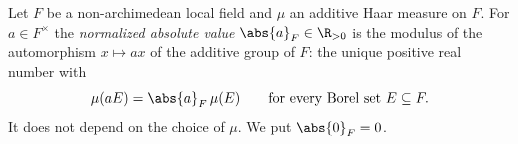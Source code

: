 Let $F$ be a non-archimedean local field and $\mu$ an additive Haar measure on $F$. For $a\in F^\times$ the
\emph{normalized absolute value} $\abs{a}_F\in\R_{>0}$ is the modulus of the automorphism $x\mapsto ax$ of the
additive group of $F$: the unique positive real number with
\[
  \mu(aE)=\abs{a}_F\,\mu(E)\qquad\text{for every Borel set }E\subseteq F.
\]
It does not depend on the choice of $\mu$. We put $\abs{0}_F=0$.
